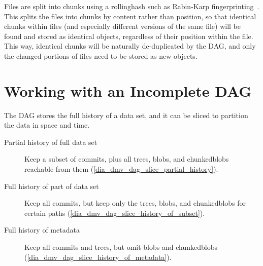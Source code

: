 Files are split into chunks using a \gls{rollinghash} such as Rabin-Karp
fingerprinting~\cite{rabin_karp_fingerprinting}. This splits the files into
chunks by content rather than position, so that identical chunks within files
(and especially different versions of the same file) will be found and stored as
identical objects, regardless of their position within the file. This way,
identical chunks will be naturally de-duplicated by the \gls{DAG}, and only the
changed portions of files need to be stored as new objects.

%


\section{Working with an Incomplete DAG}
\label{working-with-incomplete-dag}

The \gls{DAG} stores the full history of a data set, and it can be sliced to
partition the data in space and time.

\begin{description}

    \item[Partial history of full data set] Keep a subset of \glspl{commit},
        plus all \glspl{tree}, \glspl{blob}, and \glspl{chunkedblob} reachable
        from them (\autoref{dia_dmv_dag_slice_partial_history}).

    \item[Full history of part of data set] Keep all \glspl{commit}, but keep
        only the \glspl{tree}, \glspl{blob}, and \glspl{chunkedblob} for certain
        paths (\autoref{dia_dmv_dag_slice_history_of_subset}).

    \item[Full history of metadata] Keep all \glspl{commit} and \glspl{tree},
        but omit \glspl{blob} and \glspl{chunkedblob}
        (\autoref{dia_dmv_dag_slice_history_of_metadata}).

\end{description}

\newcommand{\slicediagramwidth}{0.45\textwidth}


